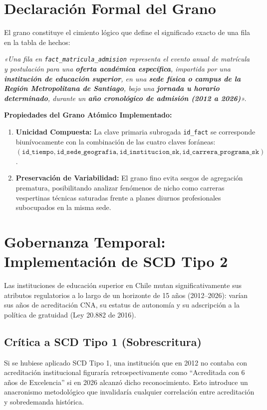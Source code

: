 \documentclass[11pt,a4paper]{article}
\begin{document}
\section{Declaración Formal del Grano}

El grano constituye el cimiento lógico que define el significado exacto de una fila en la tabla de hechos:

\begin{tcolorbox}[colback=lightbg,colframe=secondaryblue,title=\textbf{Declaración Oficial del Grano}]
\emph{«Una fila en \texttt{fact\_matricula\_admision} representa el evento anual de matrícula y postulación para una \textbf{oferta académica específica}, impartida por una \textbf{institución de educación superior}, en una \textbf{sede física o campus de la Región Metropolitana de Santiago}, bajo una \textbf{jornada u horario determinado}, durante un \textbf{año cronológico de admisión (2012 a 2026)}».}
\end{tcolorbox}

\textbf{Propiedades del Grano Atómico Implementado:}
\begin{enumerate}
    \item \textbf{Unicidad Compuesta:} La clave primaria subrogada \texttt{id\_fact} se corresponde biunívocamente con la combinación de las cuatro claves foráneas: $(\texttt{id\_tiempo}, \texttt{id\_sede\_geografia}, \texttt{id\_institucion\_sk}, \texttt{id\_carrera\_programa\_sk})$.
    \item \textbf{Preservación de Variabilidad:} El grano fino evita sesgos de agregación prematura, posibilitando analizar fenómenos de nicho como carreras vespertinas técnicas saturadas frente a planes diurnos profesionales subocupados en la misma sede.
\end{enumerate}

\section{Gobernanza Temporal: Implementación de SCD Tipo 2}

Las instituciones de educación superior en Chile mutan significativamente sus atributos regulatorios a lo largo de un horizonte de 15 años (2012--2026): varían sus años de acreditación CNA, su estatus de autonomía y su adscripción a la política de gratuidad (Ley 20.882 de 2016).

\subsection{Crítica a SCD Tipo 1 (Sobrescritura)}
Si se hubiese aplicado SCD Tipo 1, una institución que en 2012 no contaba con acreditación institucional figuraría retrospectivamente como ``Acreditada con 6 años de Excelencia'' si en 2026 alcanzó dicho reconocimiento. Esto introduce un anacronismo metodológico que invalidaría cualquier correlación entre acreditación y sobredemanda histórica.
\end{document}
